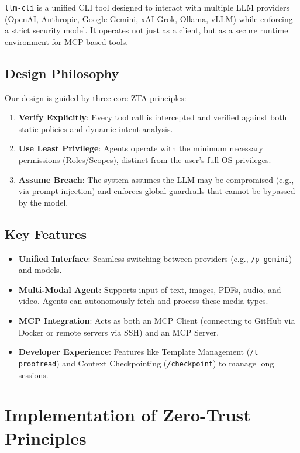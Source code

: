 \documentclass[conference]{IEEEtran}
\begin{document}
\texttt{llm-cli} is a unified CLI tool designed to interact with multiple LLM providers (OpenAI, Anthropic, Google Gemini, xAI Grok, Ollama, vLLM) while enforcing a strict security model. It operates not just as a client, but as a secure runtime environment for MCP-based tools.

\subsection{Design Philosophy}
Our design is guided by three core ZTA principles:
\begin{enumerate}
    \item \textbf{Verify Explicitly}: Every tool call is intercepted and verified against both static policies and dynamic intent analysis.
    \item \textbf{Use Least Privilege}: Agents operate with the minimum necessary permissions (Roles/Scopes), distinct from the user's full OS privileges.
    \item \textbf{Assume Breach}: The system assumes the LLM may be compromised (e.g., via prompt injection) and enforces global guardrails that cannot be bypassed by the model.
\end{enumerate}

\subsection{Key Features}
\begin{itemize}
    \item \textbf{Unified Interface}: Seamless switching between providers (e.g., \texttt{/p gemini}) and models.
    \item \textbf{Multi-Modal Agent}: Supports input of text, images, PDFs, audio, and video. Agents can autonomously fetch and process these media types.
    \item \textbf{MCP Integration}: Acts as both an MCP Client (connecting to GitHub via Docker or remote servers via SSH) and an MCP Server.
    \item \textbf{Developer Experience}: Features like Template Management (\texttt{/t proofread}) and Context Checkpointing (\texttt{/checkpoint}) to manage long sessions.
\end{itemize}

\section{Implementation of Zero-Trust Principles}
\end{document}
